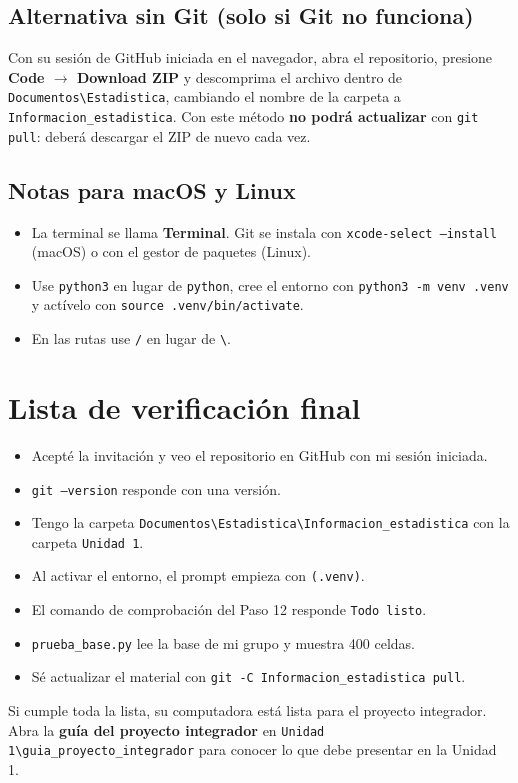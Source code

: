 \documentclass[11pt,a4paper]{article}
\newcommand{\cmd}[1]{\texttt{\textcolor{petroleo}{#1}}}
\begin{document}
\subsection*{Alternativa sin Git (solo si Git no funciona)}

Con su sesión de GitHub iniciada en el navegador, abra el repositorio, presione \textbf{Code $\rightarrow$ Download ZIP} y descomprima el archivo dentro de \texttt{Documentos\textbackslash Estadistica}, cambiando el nombre de la carpeta a \texttt{Informacion\_estadistica}. Con este método \textbf{no podrá actualizar} con \texttt{git pull}: deberá descargar el ZIP de nuevo cada vez.

\subsection*{Notas para macOS y Linux}

\begin{itemize}
  \item La terminal se llama \textbf{Terminal}. Git se instala con \cmd{xcode-select --install} (macOS) o con el gestor de paquetes (Linux).
  \item Use \cmd{python3} en lugar de \cmd{python}, cree el entorno con \cmd{python3 -m venv .venv} y actívelo con \cmd{source .venv/bin/activate}.
  \item En las rutas use \texttt{/} en lugar de \texttt{\textbackslash}.
\end{itemize}

\section{Lista de verificación final}

\begin{itemize}[label=$\square$]
  \item Acepté la invitación y veo el repositorio en GitHub con mi sesión iniciada.
  \item \cmd{git --version} responde con una versión.
  \item Tengo la carpeta \texttt{Documentos\textbackslash Estadistica\textbackslash Informacion\_estadistica} con la carpeta \texttt{Unidad 1}.
  \item Al activar el entorno, el prompt empieza con \texttt{(.venv)}.
  \item El comando de comprobación del Paso 12 responde \texttt{Todo listo}.
  \item \texttt{prueba\_base.py} lee la base de mi grupo y muestra 400 celdas.
  \item Sé actualizar el material con \cmd{git -C Informacion\_estadistica pull}.
\end{itemize}

\vspace{0.4em}
\begin{exito}
Si cumple toda la lista, su computadora está lista para el proyecto integrador. Abra la \textbf{guía del proyecto integrador} en \texttt{Unidad 1\textbackslash guia\_proyecto\_integrador} para conocer lo que debe presentar en la Unidad 1.
\end{exito}
\end{document}
